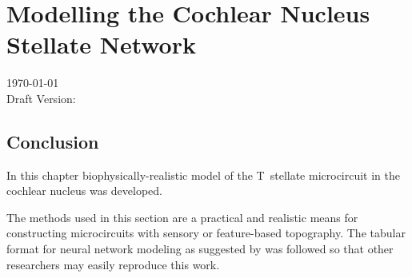 \documentclass[10pt,a4paper,twoside,openright]{book}
\begin{document}
		{%
			\singlespacing%
			\tableofcontents%
			\listoffigures%
			\listoftables
                        \printglossaries
		   \clearpage%
		}%

\setcounter{chapter}{2}
\chapter[Simple Responses]{Modelling the Cochlear Nucleus Stellate Network \label{sec:SimpleResponsesChapter}}

\medskip{}
\centerline{\today\\ Draft Version:  }




 
 \newpage
 
 
 
 \newpage
 
 
 
 \newpage
 
 
 
  \newpage
  
  
  
 \newpage
 
 

\newpage


\section{Conclusion}

In this chapter biophysically-realistic model of the T~stellate microcircuit in
the cochlear nucleus was developed.


The methods used in this section are a practical and realistic means for
constructing microcircuits with sensory or feature-based topography.  The
tabular format for neural network modeling as suggested by
\citet{NordlieGewaltigEtAl:2009} was followed so that other researchers may
easily reproduce this work.




 

\newpage
\listoftodos
\end{document}
